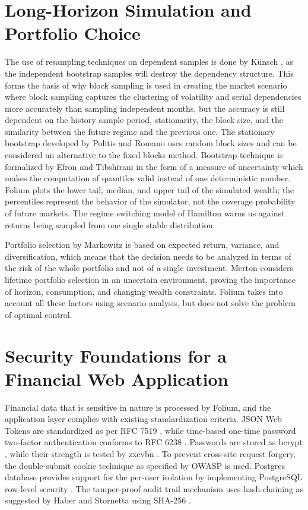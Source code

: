 \section{Long-Horizon Simulation and Portfolio Choice}
The use of resampling techniques on dependent samples is done by Künsch \cite{b12}, as the independent bootstrap samples will destroy the dependency structure. This forms the basis of why block sampling is used in creating the market scenario where block sampling captures the clustering of volatility and serial dependencies more accurately than sampling independent months, but the accuracy is still dependent on the history sample period, stationarity, the block size, and the similarity between the future regime and the previous one. The stationary bootstrap developed by Politis and Romano \cite{b33} uses random block sizes and can be considered an alternative to the fixed blocks method. Bootstrap technique is formalized by Efron and Tibshirani \cite{b13} in the form of a measure of uncertainty which makes the computation of quantiles valid instead of one deterministic number. Folium plots the lower tail, median, and upper tail of the simulated wealth; the percentiles represent the behavior of the simulator, not the coverage probability of future markets. The regime switching model of Hamilton \cite{b23} warns us against returns being sampled from one single stable distribution.

Portfolio selection by Markowitz \cite{b21} is based on expected return, variance, and diversification, which means that the decision needs to be analyzed in terms of the risk of the whole portfolio and not of a single investment. Merton \cite{b22} considers lifetime portfolio selection in an uncertain environment, proving the importance of horizon, consumption, and changing wealth constraints. Folium takes into account all these factors using scenario analysis, but does not solve the problem of optimal control.

\section{Security Foundations for a Financial Web Application}
Financial data that is sensitive in nature is processed by Folium, and the application layer complies with existing standardization criteria. JSON Web Tokens are standardized as per RFC 7519 \cite{b38}, while time-based one-time password two-factor authentication conforms to RFC 6238 \cite{b39}. Passwords are stored as bcrypt \cite{b40}, while their strength is tested by zxcvbn \cite{b41}. To prevent cross-site request forgery, the double-submit cookie technique as specified by OWASP \cite{b42} is used. Postgres database provides support for the per-user isolation by implementing PostgreSQL row-level security \cite{b43}. The tamper-proof audit trail mechanism uses hash-chaining as suggested by Haber and Stornetta \cite{b44} using SHA-256 \cite{b45}\cite{b46}.

